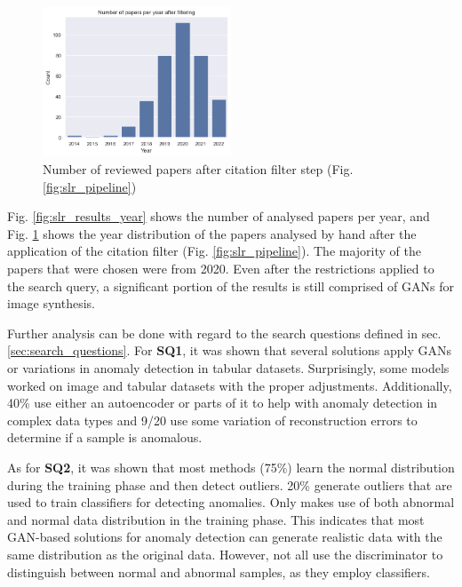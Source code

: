 \begin{figure}[ht]
\centering
\includegraphics[width=0.5\textwidth]{figures/slr_results_filtering.png}
\caption{Number of reviewed papers after citation filter step (Fig. \ref{fig:slr_pipeline})}
\label{fig:slr_after_filter}
\end{figure}

Fig. \ref{fig:slr_results_year} shows the number of analysed papers per year, and Fig. \ref{fig:slr_after_filter} shows the year distribution of the papers analysed by hand after the application of the citation filter (Fig. \ref{fig:slr_pipeline}). The majority of the papers that were chosen were from 2020. Even after the restrictions applied to the search query, a significant portion of the results is still comprised of GANs for image synthesis.

Further analysis can be done with regard to the search questions defined in sec. \ref{sec:search_questions}. For \textbf{SQ1}, it was shown that several solutions apply GANs or variations in anomaly detection in tabular datasets. Surprisingly, some models worked on image and tabular datasets with the proper adjustments. Additionally, 40\% use either an autoencoder or parts of it to help with anomaly detection in complex data types and 9/20 use some variation of reconstruction errors to determine if a sample is anomalous.

As for \textbf{SQ2}, it was shown that most methods (75\%) learn the normal distribution during the training phase and then detect outliers. 20\% generate outliers that are used to train classifiers for detecting anomalies. Only \cite{wang.etal_AnomalyDetectionMinimum_2018} makes use of both abnormal and normal data distribution in the training phase. This indicates that most GAN-based solutions for anomaly detection can generate realistic data with the same distribution as the original data. However, not all use the discriminator to distinguish between normal and abnormal samples, as they employ classifiers.


